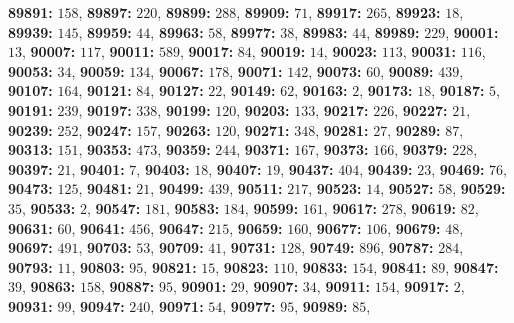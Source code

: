 \textsf{\bfseries 89891:} $158$, \textsf{\bfseries 89897:} $220$, \textsf{\bfseries 89899:} $288$, \textsf{\bfseries 89909:} $71$, \textsf{\bfseries 89917:} $265$, \textsf{\bfseries 89923:} $18$, \textsf{\bfseries 89939:} $145$, \textsf{\bfseries 89959:} $44$, \textsf{\bfseries 89963:} $58$, \textsf{\bfseries 89977:} $38$, \textsf{\bfseries 89983:} $44$, \textsf{\bfseries 89989:} $229$, \textsf{\bfseries 90001:} $13$, \textsf{\bfseries 90007:} $117$, \textsf{\bfseries 90011:} $589$, \textsf{\bfseries 90017:} $84$, \textsf{\bfseries 90019:} $14$, \textsf{\bfseries 90023:} $113$, \textsf{\bfseries 90031:} $116$, \textsf{\bfseries 90053:} $34$, \textsf{\bfseries 90059:} $134$, \textsf{\bfseries 90067:} $178$, \textsf{\bfseries 90071:} $142$, \textsf{\bfseries 90073:} $60$, \textsf{\bfseries 90089:} $439$, \textsf{\bfseries 90107:} $164$, \textsf{\bfseries 90121:} $84$, \textsf{\bfseries 90127:} $22$, \textsf{\bfseries 90149:} $62$, \textsf{\bfseries 90163:} $2$, \textsf{\bfseries 90173:} $18$, \textsf{\bfseries 90187:} $5$, \textsf{\bfseries 90191:} $239$, \textsf{\bfseries 90197:} $338$, \textsf{\bfseries 90199:} $120$, \textsf{\bfseries 90203:} $133$, \textsf{\bfseries 90217:} $226$, \textsf{\bfseries 90227:} $21$, \textsf{\bfseries 90239:} $252$, \textsf{\bfseries 90247:} $157$, \textsf{\bfseries 90263:} $120$, \textsf{\bfseries 90271:} $348$, \textsf{\bfseries 90281:} $27$, \textsf{\bfseries 90289:} $87$, \textsf{\bfseries 90313:} $151$, \textsf{\bfseries 90353:} $473$, \textsf{\bfseries 90359:} $244$, \textsf{\bfseries 90371:} $167$, \textsf{\bfseries 90373:} $166$, \textsf{\bfseries 90379:} $228$, \textsf{\bfseries 90397:} $21$, \textsf{\bfseries 90401:} $7$, \textsf{\bfseries 90403:} $18$, \textsf{\bfseries 90407:} $19$, \textsf{\bfseries 90437:} $404$, \textsf{\bfseries 90439:} $23$, \textsf{\bfseries 90469:} $76$, \textsf{\bfseries 90473:} $125$, \textsf{\bfseries 90481:} $21$, \textsf{\bfseries 90499:} $439$, \textsf{\bfseries 90511:} $217$, \textsf{\bfseries 90523:} $14$, \textsf{\bfseries 90527:} $58$, \textsf{\bfseries 90529:} $35$, \textsf{\bfseries 90533:} $2$, \textsf{\bfseries 90547:} $181$, \textsf{\bfseries 90583:} $184$, \textsf{\bfseries 90599:} $161$, \textsf{\bfseries 90617:} $278$, \textsf{\bfseries 90619:} $82$, \textsf{\bfseries 90631:} $60$, \textsf{\bfseries 90641:} $456$, \textsf{\bfseries 90647:} $215$, \textsf{\bfseries 90659:} $160$, \textsf{\bfseries 90677:} $106$, \textsf{\bfseries 90679:} $48$, \textsf{\bfseries 90697:} $491$, \textsf{\bfseries 90703:} $53$, \textsf{\bfseries 90709:} $41$, \textsf{\bfseries 90731:} $128$, \textsf{\bfseries 90749:} $896$, \textsf{\bfseries 90787:} $284$, \textsf{\bfseries 90793:} $11$, \textsf{\bfseries 90803:} $95$, \textsf{\bfseries 90821:} $15$, \textsf{\bfseries 90823:} $110$, \textsf{\bfseries 90833:} $154$, \textsf{\bfseries 90841:} $89$, \textsf{\bfseries 90847:} $39$, \textsf{\bfseries 90863:} $158$, \textsf{\bfseries 90887:} $95$, \textsf{\bfseries 90901:} $29$, \textsf{\bfseries 90907:} $34$, \textsf{\bfseries 90911:} $154$, \textsf{\bfseries 90917:} $2$, \textsf{\bfseries 90931:} $99$, \textsf{\bfseries 90947:} $240$, \textsf{\bfseries 90971:} $54$, \textsf{\bfseries 90977:} $95$, \textsf{\bfseries 90989:} $85$, 
